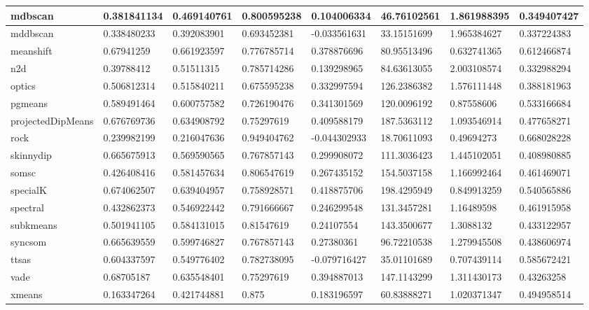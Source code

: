 \begin{table}[H]
\begin{tabular}{|l|l|l|l|l|l|l|l|}
\hline
mdbscan & 0.381841134 & 0.469140761 & 0.800595238 & 0.104006334 & 46.76102561 & 1.861988395 & 0.349407427 \\
\hline
mddbscan & 0.338480233 & 0.392083901 & 0.693452381 & -0.033561631 & 33.15151699 & 1.965384627 & 0.337224383 \\
\hline
meanshift & 0.67941259 & 0.661923597 & 0.776785714 & 0.378876696 & 80.95513496 & 0.632741365 & 0.612466874 \\
\hline
n2d & 0.39788412 & 0.51511315 & 0.785714286 & 0.139298965 & 84.63613055 & 2.003108574 & 0.332988294 \\
\hline
optics & 0.506812314 & 0.515840211 & 0.675595238 & 0.332997594 & 126.2386382 & 1.576111448 & 0.388181963 \\
\hline
pgmeans & 0.589491464 & 0.600757582 & 0.726190476 & 0.341301569 & 120.0096192 & 0.87558606 & 0.533166684 \\
\hline
projectedDipMeans & 0.676769736 & 0.634908792 & 0.75297619 & 0.409588179 & 187.5363112 & 1.093546914 & 0.477658271 \\
\hline
rock & 0.239982199 & 0.216047636 & 0.949404762 & -0.044302933 & 18.70611093 & 0.49694273 & 0.668028228 \\
\hline
skinnydip & 0.665675913 & 0.569590565 & 0.767857143 & 0.299908072 & 111.3036423 & 1.445102051 & 0.408980885 \\
\hline
somsc & 0.426408416 & 0.581457634 & 0.806547619 & 0.267435152 & 154.5037158 & 1.166992464 & 0.461469071 \\
\hline
specialK & 0.674062507 & 0.639404957 & 0.758928571 & 0.418875706 & 198.4295949 & 0.849913259 & 0.540565886 \\
\hline
spectral & 0.432862373 & 0.546922442 & 0.791666667 & 0.246299548 & 131.3457281 & 1.16489598 & 0.461915958 \\
\hline
subkmeans & 0.501941105 & 0.584131015 & 0.81547619 & 0.24107554 & 143.3500677 & 1.3088132 & 0.433122957 \\
\hline
syncsom & 0.665639559 & 0.599746827 & 0.767857143 & 0.27380361 & 96.72210538 & 1.279945508 & 0.438606974 \\
\hline
ttsas & 0.604337597 & 0.549776402 & 0.782738095 & -0.079716427 & 35.01101689 & 0.707439114 & 0.585672421 \\
\hline
vade & 0.68705187 & 0.635548401 & 0.75297619 & 0.394887013 & 147.1143299 & 1.311430173 & 0.43263258 \\
\hline
xmeans & 0.163347264 & 0.421744881 & 0.875 & 0.183196597 & 60.83888271 & 1.020371347 & 0.494958514 \\
\hline
\end{tabular}
\end{table}